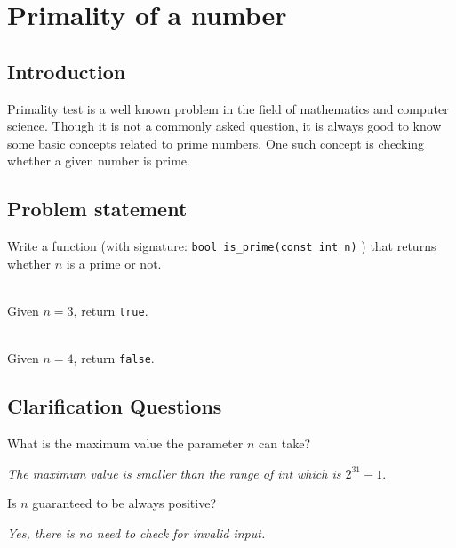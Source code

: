 %

\chapter{Primality of a number}
\label{ch:primality_test}
\section*{Introduction}
Primality test is a well known problem in the field of mathematics and computer science. Though it is not a commonly asked question, it is always good to know some basic concepts related to prime numbers. One such concept is checking whether a given number is prime.

\section{Problem statement}
Write a function (with signature: \lstinline[columns=fixed]{bool is_prime(const int n)} ) that returns whether $n$ is a prime or not.

\begin{exercise}

\end{exercise}


\begin{example}
	\hfill \\
	Given $n = 3$, return \lstinline[columns=fixed]{true}.
\end{example}

\begin{example}
	\hfill \\
	Given $n = 4$, return \lstinline[columns=fixed]{false}.
\end{example}

\section{Clarification Questions}

\begin{QandA}
	\item What is the maximum value the parameter $n$ can take?
	\begin{answered}
		\textit{The maximum value is smaller than the range of int which is $2^{31} - 1$}.
	\end{answered}
	
	\item Is $n$ guaranteed to be always positive?
	\begin{answered}
		\textit{Yes, there is no need to check for invalid input.}
	\end{answered}
\end{QandA}

